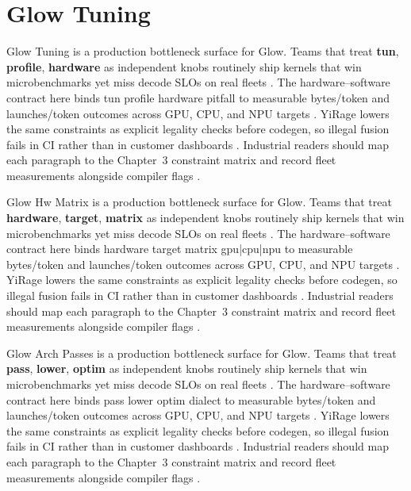 \section{Glow Tuning}
\label{sec:glow_tuning}

Glow Tuning is a production bottleneck surface for Glow. Teams that treat \textbf{tun}, \textbf{profile}, \textbf{hardware} as independent knobs routinely ship kernels that win microbenchmarks yet miss decode SLOs on real fleets \citep{nvidia2022hopper,amd2024aie}. The hardware--software contract here binds tun profile hardware pitfall to measurable bytes/token and launches/token outcomes across GPU, CPU, and NPU targets \citep{semianalysis2024tma,dlbook}. YiRage lowers the same constraints as explicit legality checks before codegen, so illegal fusion fails in CI rather than in customer dashboards \citep{amd2024xdna,dao2022flashattention}. Industrial readers should map each paragraph to the Chapter~3 constraint matrix and record fleet measurements alongside compiler flags \citep{amd2024aie,kwon2023vllm}.

Glow Hw Matrix is a production bottleneck surface for Glow. Teams that treat \textbf{hardware}, \textbf{target}, \textbf{matrix} as independent knobs routinely ship kernels that win microbenchmarks yet miss decode SLOs on real fleets \citep{taxbreak2026,semianalysis2024tma}. The hardware--software contract here binds hardware target matrix gpu|cpu|npu to measurable bytes/token and launches/token outcomes across GPU, CPU, and NPU targets \citep{memoryfloor2026,amd2024xdna}. YiRage lowers the same constraints as explicit legality checks before codegen, so illegal fusion fails in CI rather than in customer dashboards \citep{nvidia2022hopper,amd2024aie}. Industrial readers should map each paragraph to the Chapter~3 constraint matrix and record fleet measurements alongside compiler flags \citep{semianalysis2024tma,dlbook}.

Glow Arch Passes is a production bottleneck surface for Glow. Teams that treat \textbf{pass}, \textbf{lower}, \textbf{optim} as independent knobs routinely ship kernels that win microbenchmarks yet miss decode SLOs on real fleets \citep{memoryfloor2026,amd2024xdna}. The hardware--software contract here binds pass lower optim dialect to measurable bytes/token and launches/token outcomes across GPU, CPU, and NPU targets \citep{nvidia2022hopper,amd2024aie}. YiRage lowers the same constraints as explicit legality checks before codegen, so illegal fusion fails in CI rather than in customer dashboards \citep{semianalysis2024tma,dlbook}. Industrial readers should map each paragraph to the Chapter~3 constraint matrix and record fleet measurements alongside compiler flags \citep{amd2024xdna,dao2022flashattention}.

